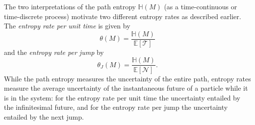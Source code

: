 \documentclass[smallextended]{svjour3}
\newcommand{\E}{\mathbb{E}}
\newcommand{\TT}{\mathcal{T}}
\renewcommand{\H}{\mathbb{H}}
\newcommand{\suml}{\sum\limits}
\newcommand{\red}[1]{\textcolor{red}{#1}}
\begin{document}
% 

The two interpretations of the path entropy $\H(M)$ (as a time-continuous or time-discrete process) motivate two different entropy rates as described earlier.
The \emph{entropy rate per unit time} is given by
\begin{equation*}
  \theta(M) = \frac{\H(M)}{\E\left[\TT\right]}
\end{equation*}
and the \emph{entropy rate per jump} by
\begin{equation*}
  \theta_J(M) = \frac{\H(M)}{\E\left[\mathcal{N}\right]}.
\end{equation*}
While the path entropy measures the uncertainty of the entire path, entropy rates measure the average uncertainty of the instantaneous future of a particle while it is in the system: for the entropy rate per unit time the uncertainty entailed by the infinitesimal future, and for the entropy rate per jump the uncertainty entailed by the next jump.
% 
\end{document}
